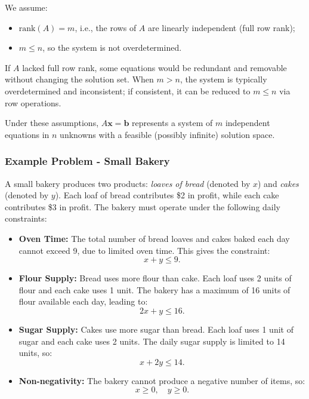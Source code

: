 We assume:
\begin{itemize}
\item $\text{rank}(A) = m$, i.e., the rows of $A$ are linearly independent (full row rank);
\item $m \leq n$, so the system is not overdetermined.
\end{itemize}

If $A$ lacked full row rank, some equations would be redundant and removable without changing the solution set. When $m > n$, the system is typically overdetermined and inconsistent; if consistent, it can be reduced to $m \leq n$ via row operations.

Under these assumptions, $A\mathbf{x} = \mathbf{b}$ represents a system of $m$ independent equations in $n$ unknowns with a feasible (possibly infinite) solution space.

\subsubsection{Example Problem - Small Bakery}
\label{sec:bakery-problem}

A small bakery produces two products: \emph{loaves of bread} (denoted by \(x\)) and \emph{cakes} (denoted by \(y\)). Each loaf of bread contributes \$2 in profit, while each cake contributes \$3 in profit. The bakery must operate under the following daily constraints:

\begin{itemize}
    \item \textbf{Oven Time:} The total number of bread loaves and cakes baked each day cannot exceed 9, due to limited oven time. This gives the constraint:
    \[
    x + y \leq 9.
    \]
    
    \item \textbf{Flour Supply:} Bread uses more flour than cake. Each loaf uses 2 units of flour and each cake uses 1 unit. The bakery has a maximum of 16 units of flour available each day, leading to:
    \[
    2x + y \leq 16.
    \]
    
    \item \textbf{Sugar Supply:} Cakes use more sugar than bread. Each loaf uses 1 unit of sugar and each cake uses 2 units. The daily sugar supply is limited to 14 units, so:
    \[
    x + 2y \leq 14.
    \]

    \item \textbf{Non-negativity:} The bakery cannot produce a negative number of items, so:
    \[
    x \geq 0, \quad y \geq 0.
    \]
\end{itemize}

